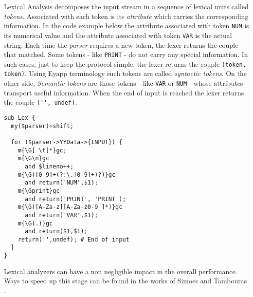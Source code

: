 Lexical Analysis decomposes the input stream in a 
sequence of lexical units called \emph{tokens}.
Associated with each token is its \emph{attribute}
which carries the corresponding information.
In the code example below
the attribute associated with token \verb|NUM|
is its numerical value and the attribute associated with 
token \verb|VAR| is the actual string.
Each time the \emph{parser}
requires a new token, the lexer returns
the couple  that matched.
Some tokens - like \verb|PRINT| -  do not carry any special
information. In such cases, just to keep the protocol
simple, the lexer returns the couple \verb|(token, token)|.
Using Eyapp terminology such tokens are called \emph{syntactic tokens}.
On the other side, \emph{Semantic tokens} are those tokens - like \verb|VAR|
or \verb|NUM| - whose attributes transport 
useful information. When the end of input is reached the lexer
returns the couple \verb|('', undef)|.

\begin{verbatim}
sub Lex {
  my($parser)=shift; 
  
  for ($parser->YYData->{INPUT}) { 
    m{\G[ \t]*}gc;
    m{\G\n}gc                      
      and $lineno++;
    m{\G([0-9]+(?:\.[0-9]+)?)}gc   
      and return('NUM',$1);
    m{\Gprint}gc                   
      and return('PRINT', 'PRINT');
    m{\G([A-Za-z][A-Za-z0-9_]*)}gc 
      and return('VAR',$1);
    m{\G(.)}gc                     
      and return($1,$1);
    return('',undef); # End of input
  }
}
\end{verbatim}
%

Lexical analyzers can have a non negligible impact in 
the overall performance. Ways to speed up this stage can be found 
in the works of Simoes \cite{simoes} and Tambouras \cite{Tambouras}.
